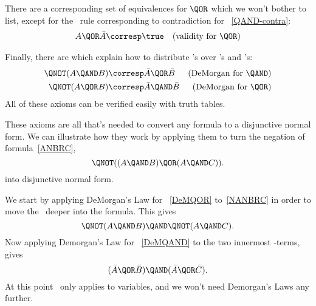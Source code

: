 There are a corresponding set of equivalences for $\QOR$ which we
won't bother to list, except for the \QOR\ rule corresponding to
contradiction for \QAND~\eqref{QAND-contra}:
\begin{align*}
A \QOR \bar{A} & \corresp \true  & \text{(validity for \QOR)}
\end{align*}

\iffalse
There is also a familiar rule connecting \QAND\ and \QOR:
\begin{align}
\lefteqn{A \QAND (B \QOR C)}\notag\\
 & \corresp (A \QAND B) \QOR (A \QAND C) &\qquad \text{(distributivity
  of \QAND\ over \QOR)}\label{qand-distributivity}
\end{align}
\fi

Finally, there are %
which explain how to
distribute \QNOT's over \QAND's and \QOR's:
\begin{align}
\QNOT(A \QAND B) &\corresp \bar{A} \QOR \bar{B} & \text{(DeMorgan for \QAND)} \label{DeMQAND}\\
\QNOT(A \QOR B) &\corresp \bar{A} \QAND \bar{B} & \text{(DeMorgan for \QOR)}
\label{DeMQOR} 
\end{align}
All of these axioms can be verified easily with truth tables.

These axioms are all that's needed to convert any formula to a
disjunctive normal form.  We can illustrate how they work by applying
them to turn the negation of formula~\eqref{ANBRC},
\begin{equation}\label{NANBRC}
\QNOT((A \QAND B) \QOR (A \QAND C)).
\end{equation}
into disjunctive normal form.

We start by applying DeMorgan's Law for \QOR~\eqref{DeMQOR}
to~\eqref{NANBRC} in order to move the \QNOT\ deeper into the formula.
This gives
\[
\QNOT(A \QAND B) \QAND \QNOT(A \QAND C).
\]
Now applying Demorgan's Law for \QAND~\eqref{DeMQAND} to the two
innermost \QAND-terms, gives
\begin{equation}\label{NAONBANAONC}
(\bar{A} \QOR \bar{B}) \QAND (\bar{A} \QOR \bar{C}).
\end{equation}
At this point \QNOT\ only applies to variables, and we won't need
Demorgan's Laws any further.

